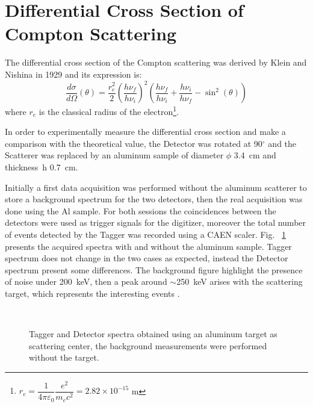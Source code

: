 \newpage
\section*{Differential Cross Section of Compton Scattering}
The differential cross section of the Compton scattering was derived by Klein and Nishina in 1929 and its expression is:
\begin{equation*}
	\frac{d\sigma}{d\Omega}(\theta)=\frac{r_e ^2}{2}\left(\frac{h \nu_f}{h \nu_i}\right)^2\left(\frac{h \nu_f}{h \nu_i}+\frac{h \nu_i}{h \nu_f}-\sin^2(\theta)\right)
\end{equation*}
where $r_e$ is the classical radius of the electron\footnote{$r_e =\dfrac{1}{4\pi \varepsilon_0}\dfrac{e^2}{m_ec^2} =2.82 \times 10^{-15}$ m}.

\medskip

In order to experimentally measure the differential cross section and make a comparison with the theoretical value, the Detector was rotated at 90$^\circ$ and the Scatterer was replaced by an aluminum sample of  diameter $\phi$ 3.4~cm and thickness~h 0.7~cm.  

Initially  a first data acquisition was performed without the aluminum scatterer to store a background spectrum for the two detectors, then the real acquisition was done using the Al sample. For both sessions the coincidences between the detectors were used as trigger signals for the digitizer, moreover the total number of events detected by the Tagger was recorded using a CAEN scaler. Fig.~ \ref{Fig:CrossSection_spectra} presents the acquired spectra with and without the aluminum sample. Tagger spectrum does not change in the two cases as expected, instead the Detector spectrum present some differences. The background figure highlight the presence of noise under 200~keV, then a peak around $\sim$250~keV arises with the scattering target, which represents the interesting events . 

\begin{figure}[h!]
	\centering
	 \quad
	 \quad
	 \quad
	\\
	\caption{Tagger and Detector spectra obtained using an aluminum target as scattering center, the background measurements were performed without the target.}
	\label{Fig:CrossSection_spectra}
\end{figure}

